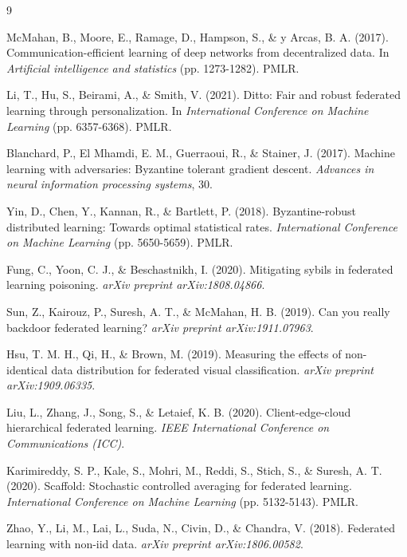 \documentclass[11pt, a4paper]{article}
\begin{document}
\begin{thebibliography}{9}

McMahan, B., Moore, E., Ramage, D., Hampson, S., \& y Arcas, B. A. (2017). 
Communication-efficient learning of deep networks from decentralized data. 
In \textit{Artificial intelligence and statistics} (pp. 1273-1282). PMLR.

Li, T., Hu, S., Beirami, A., \& Smith, V. (2021). 
Ditto: Fair and robust federated learning through personalization. 
In \textit{International Conference on Machine Learning} (pp. 6357-6368). PMLR.

Blanchard, P., El Mhamdi, E. M., Guerraoui, R., \& Stainer, J. (2017). 
Machine learning with adversaries: Byzantine tolerant gradient descent. 
\textit{Advances in neural information processing systems}, 30.

Yin, D., Chen, Y., Kannan, R., \& Bartlett, P. (2018). 
Byzantine-robust distributed learning: Towards optimal statistical rates. 
\textit{International Conference on Machine Learning} (pp. 5650-5659). PMLR.

Fung, C., Yoon, C. J., \& Beschastnikh, I. (2020). 
Mitigating sybils in federated learning poisoning. 
\textit{arXiv preprint arXiv:1808.04866}.

Sun, Z., Kairouz, P., Suresh, A. T., \& McMahan, H. B. (2019). 
Can you really backdoor federated learning? 
\textit{arXiv preprint arXiv:1911.07963}.

Hsu, T. M. H., Qi, H., \& Brown, M. (2019). 
Measuring the effects of non-identical data distribution for federated visual classification. 
\textit{arXiv preprint arXiv:1909.06335}.

Liu, L., Zhang, J., Song, S., \& Letaief, K. B. (2020). 
Client-edge-cloud hierarchical federated learning. 
\textit{IEEE International Conference on Communications (ICC)}.

Karimireddy, S. P., Kale, S., Mohri, M., Reddi, S., Stich, S., \& Suresh, A. T. (2020). 
Scaffold: Stochastic controlled averaging for federated learning. 
\textit{International Conference on Machine Learning} (pp. 5132-5143). PMLR.

Zhao, Y., Li, M., Lai, L., Suda, N., Civin, D., \& Chandra, V. (2018). 
Federated learning with non-iid data. 
\textit{arXiv preprint arXiv:1806.00582}.

\end{thebibliography}
\end{document}
